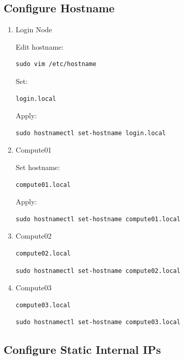\documentclass[11pt]{article}
\begin{document}
\subsection{Configure Hostname}
\label{sec:orgcc3afbc}
\begin{enumerate}
\item Login Node
\label{sec:org458d5f0}

Edit hostname:

\begin{verbatim}
sudo vim /etc/hostname
\end{verbatim}

Set:

\begin{verbatim}
login.local
\end{verbatim}

Apply:

\begin{verbatim}
sudo hostnamectl set-hostname login.local
\end{verbatim}
\item Compute01
\label{sec:orgf047b79}

Set hostname:

\begin{verbatim}
compute01.local
\end{verbatim}

Apply:

\begin{verbatim}
sudo hostnamectl set-hostname compute01.local
\end{verbatim}
\item Compute02
\label{sec:org6438e4d}

\begin{verbatim}
compute02.local
\end{verbatim}

\begin{verbatim}
sudo hostnamectl set-hostname compute02.local
\end{verbatim}
\item Compute03
\label{sec:org3a51d1e}

\begin{verbatim}
compute03.local
\end{verbatim}

\begin{verbatim}
sudo hostnamectl set-hostname compute03.local
\end{verbatim}
\end{enumerate}
\subsection{Configure Static Internal IPs}
\label{sec:org7fc40e9}
\end{document}
